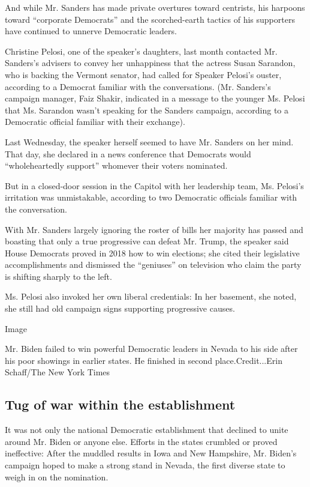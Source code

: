 And while Mr. Sanders has made private overtures toward centrists, his
harpoons toward ``corporate Democrats'' and the scorched-earth tactics
of his supporters have continued to unnerve Democratic leaders.

Christine Pelosi, one of the speaker's daughters, last month contacted
Mr. Sanders's advisers to convey her unhappiness that the actress Susan
Sarandon, who is backing the Vermont senator, had called for Speaker
Pelosi's ouster, according to a Democrat familiar with the
conversations. (Mr. Sanders's campaign manager, Faiz Shakir, indicated
in a message to the younger Ms. Pelosi that Ms. Sarandon wasn't speaking
for the Sanders campaign, according to a Democratic official familiar
with their exchange).

Last Wednesday, the speaker herself seemed to have Mr. Sanders on her
mind. That day, she declared in a news conference that Democrats would
``wholeheartedly support'' whomever their voters nominated.

But in a closed-door session in the Capitol with her leadership team,
Ms. Pelosi's irritation was unmistakable, according to two Democratic
officials familiar with the conversation.

With Mr. Sanders largely ignoring the roster of bills her majority has
passed and boasting that only a true progressive can defeat Mr. Trump,
the speaker said House Democrats proved in 2018 how to win elections;
she cited their legislative accomplishments and dismissed the
``geniuses'' on television who claim the party is shifting sharply to
the left.

Ms. Pelosi also invoked her own liberal credentials: In her basement,
she noted, she still had old campaign signs supporting progressive
causes.

Image

Mr. Biden failed to win powerful Democratic leaders in Nevada to his
side after his poor showings in earlier states. He finished in second
place.Credit...Erin Schaff/The New York Times

\hypertarget{tug-of-war-within-the-establishment}{%
\subsection{Tug of war within the
establishment}\label{tug-of-war-within-the-establishment}}

It was not only the national Democratic establishment that declined to
unite around Mr. Biden or anyone else. Efforts in the states crumbled or
proved ineffective: After the muddled results in Iowa and New Hampshire,
Mr. Biden's campaign hoped to make a strong stand in Nevada, the first
diverse state to weigh in on the nomination.

